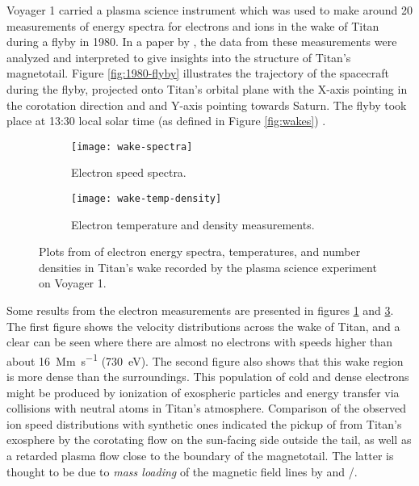 \documentclass[12pt, parskip=full*, abstract]{scrartcl}
\begin{document}
Voyager 1 carried a plasma science instrument which was used to make around 20 measurements of energy spectra for electrons and ions in the wake of Titan during a flyby in 1980. In a paper by \textcite{hartle-1982}, the data from these measurements were analyzed and interpreted to give insights into the structure of Titan's magnetotail. Figure \ref{fig:1980-flyby} illustrates the trajectory of the spacecraft during the flyby, projected onto Titan's orbital plane with the X-axis pointing in the corotation direction and and Y-axis pointing towards Saturn. The flyby took place at 13:30 local solar time (as defined in Figure \ref{fig:wakes}) \parencite{ness-1982}. 

\begin{figure}[htbp]
	\begin{subfigure}{\textwidth}
		\centering
		\texttt{[image: wake-spectra]}
		\caption{Electron speed spectra.}
		\label{fig:wake-spectra}	
	\end{subfigure}
	\begin{subfigure}{\textwidth}
		\centering
		\texttt{[image: wake-temp-density]}
		\caption{Electron temperature and density measurements.}
		\label{fig:wake-temp-density}
	\end{subfigure}
	\caption{Plots from \textcite{hartle-1982} of electron energy spectra, temperatures, and number densities in Titan's wake recorded by the plasma science experiment on Voyager 1.}
\end{figure}

Some results from the electron measurements are presented in figures \ref{fig:wake-spectra} and \ref{fig:wake-temp-density}. The first figure shows the velocity distributions across the wake of Titan, and a clear  can be seen where there are almost no electrons with speeds higher than about \SI{16}{\mega\metre\per\second} (\SI{730}{\electronvolt}). The second figure also shows that this wake region is more dense than the surroundings. This population of cold and dense electrons might be produced by ionization of exospheric particles and energy transfer via collisions with neutral atoms in Titan's atmosphere. Comparison of the observed ion speed distributions with synthetic ones indicated the pickup of  from Titan's exosphere by the corotating flow on the sun-facing side outside the tail, as well as a retarded plasma flow close to the boundary of the magnetotail. The latter is thought to be due to \textit{mass loading} of the magnetic field lines by  and /.
\end{document}
